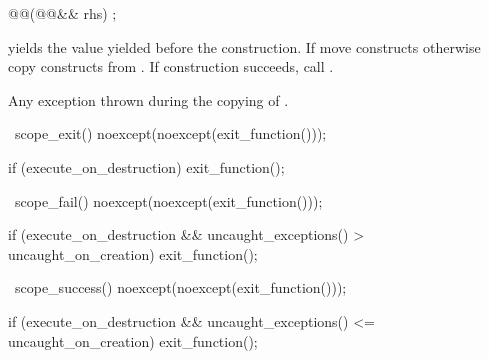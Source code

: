 \documentclass[ebook,11pt,article]{memoir}
\begin{document}
\begin{itemdecl}
@@(@@&& rhs) ;
\end{itemdecl}

\begin{itemdescr}
\pnum
\effects %
 yields the value  yielded before the construction.
If  move constructs otherwise copy constructs  from . If construction succeeds, call .

\pnum
\throws Any exception thrown during the copying of .
\end{itemdescr}

\begin{itemdecl}
~scope_exit() noexcept(noexcept(exit_function()));
\end{itemdecl}

\begin{itemdescr}
\pnum
\effects 
\begin{codeblock}
if (execute_on_destruction)
	exit_function();
\end{codeblock}
\end{itemdescr}

\begin{itemdecl}
~scope_fail() noexcept(noexcept(exit_function()));
\end{itemdecl}

\begin{itemdescr}
\pnum
\effects 
\begin{codeblock}
if (execute_on_destruction
   && uncaught_exceptions() > uncaught_on_creation)
	exit_function();
\end{codeblock}
\end{itemdescr}

\begin{itemdecl}
~scope_success() noexcept(noexcept(exit_function()));
\end{itemdecl}

\begin{itemdescr}
\pnum
\effects
\begin{codeblock}
if (execute_on_destruction 
   && uncaught_exceptions() <= uncaught_on_creation)
	exit_function();   
\end{codeblock}
\end{itemdescr}
\end{document}
